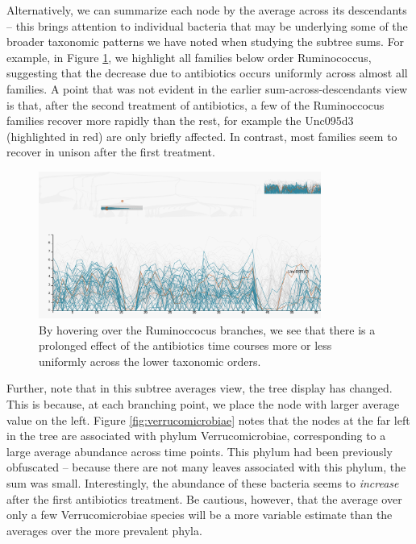 \documentclass[12pt]{article}
\begin{document}
Alternatively, we can summarize each node by the average across its
descendants -- this brings attention to individual bacteria that may be
underlying some of the broader taxonomic patterns we have noted when
studying the subtree sums. For example, in Figure
\ref{fig:ruminococcus}, we highlight all families below order
Ruminococcus, suggesting that the decrease due to antibiotics occurs
uniformly across almost all families. A point that was not evident in
the earlier sum-across-descendants view is that, after the second
treatment of antibiotics, a few of the Ruminoccocus families recover
more rapidly than the rest, for example the Unc095d3 (highlighted in
red) are only briefly affected. In contrast, most families seem to
recover in unison after the first treatment.

\begin{figure}

{\centering \includegraphics[width=350px]{figure/ruminococcus}

}

\caption{By hovering over the Ruminoccocus branches, we see that there is a
  prolonged effect of the antibiotics time courses more or less uniformly across
  the lower taxonomic orders.}\label{fig:ruminococcus}
\end{figure}

Further, note that in this subtree averages view, the tree display has changed.
This is because, at each branching point, we place the node with larger average
value on the left. Figure \ref{fig:verrucomicrobiae} notes that the nodes at
the far left in the tree are associated with phylum Verrucomicrobiae,
corresponding to a large average abundance across time points. This phylum had
been previously obfuscated -- because there are not many leaves associated with
this phylum, the sum was small. Interestingly, the abundance of these bacteria
seems to \emph{increase} after the first antibiotics treatment. Be cautious,
however, that the average over only a few Verrucomicrobiae species will be a
more variable estimate than the averages over the more prevalent phyla.
\end{document}
